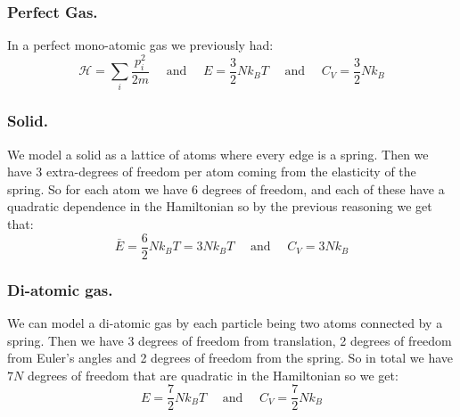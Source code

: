 \documentclass[10pt,a4paper]{book}
\begin{document}
\subsubsection{Perfect Gas.}
In a perfect mono-atomic gas we previously had:
\[
\mathcal{H} = \sum_i \frac{p_i^2}{2m} \quad \text{ and } \quad E = \frac{3}{2}Nk_B T \quad \text{ and } \quad C_V = \frac{3}{2}Nk_B
\]
\subsubsection{Solid.}
We model a solid as a lattice of atoms where every edge is a spring. Then we have $3$ extra-degrees of freedom per atom coming from the elasticity of the spring. So for each atom we have 6 degrees of freedom, and each of these have a quadratic dependence in the Hamiltonian so by the previous reasoning we get that:
\[
\bar{E} = \frac{6}{2}N k_B T = 3 N k_B T \quad \text{ and } \quad C_V = 3 N k_B
\]
\subsubsection{Di-atomic gas.}
We can model a di-atomic gas by each particle being two atoms connected by a spring.  Then we have $3$ degrees of freedom from translation, 2 degrees of freedom from Euler's angles and 2 degrees of freedom from the spring. So in total we have $7N$ degrees of freedom that are quadratic in the Hamiltonian so we get:
\[
E = \frac{7}{2}Nk_B T \quad \text{ and } \quad C_V = \frac{7}{2} N k_B
\]
\end{document}
